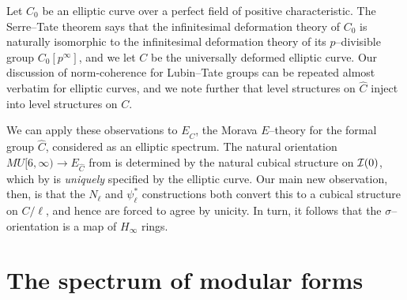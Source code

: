 \begin{example}
Let $C_0$ be an elliptic curve over a perfect field of positive characteristic.  The Serre--Tate theorem says that the infinitesimal deformation theory of $C_0$ is naturally isomorphic to the infinitesimal deformation theory of its $p$--divisible group $C_0[p^\infty]$, and we let $C$ be the universally deformed elliptic curve.  Our discussion of norm-coherence for Lubin--Tate groups can be repeated almost verbatim for elliptic curves, and we note further that level structures on $\widehat C$ inject into level structures on $C$.

We can apply these observations to $E_{\widehat C}$, the Morava $E$--theory for the formal group $\widehat C$, considered as an elliptic spectrum.  The natural orientation $MU[6, \infty) \to E_{\widehat C}$ from  is determined by the natural cubical structure on $\mathcal{I}(0)$, which by  is \emph{uniquely} specified by the elliptic curve.  Our main new observation, then, is that the $N_\ell$ and $\psi_\ell^*$ constructions both convert this to a cubical structure on $C / \ell$, and hence are forced to agree by unicity.  In turn, it follows that the $\sigma$--orientation is a map of $H_\infty$ rings.
\end{example}




















\section{The spectrum of modular forms}\label{ConstructionOfTMFSection}

